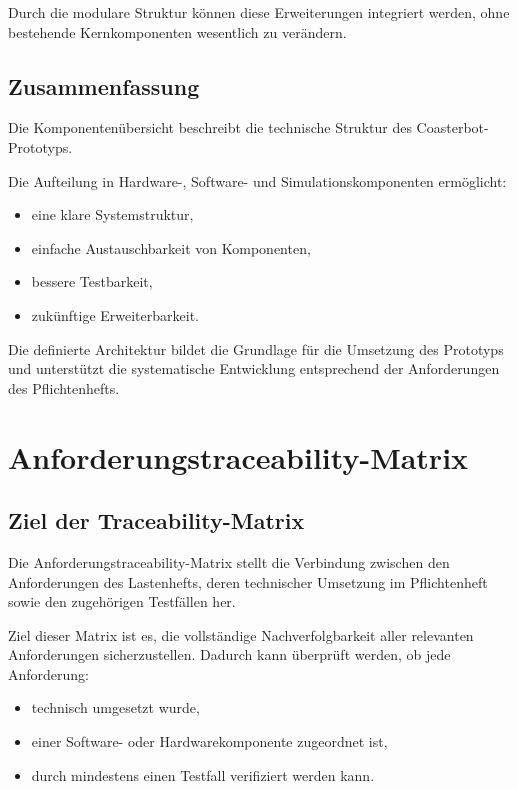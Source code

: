 \documentclass[
  a4paper,
  12pt,
  DIV=12,        %
  parskip=half,  %
  headings=small %
]{scrartcl}
\theoremstyle{definition}
\providecommand{\tightlist}{%
  \setlength{\itemsep}{0pt}\setlength{\parskip}{0pt}}
\theoremstyle{definition}
\begin{document}
Durch die modulare Struktur können diese Erweiterungen integriert
werden, ohne bestehende Kernkomponenten wesentlich zu verändern.

\subsection{Zusammenfassung}\label{zusammenfassung-6}

Die Komponentenübersicht beschreibt die technische Struktur des
Coasterbot-Prototyps.

Die Aufteilung in Hardware-, Software- und Simulationskomponenten
ermöglicht:

\begin{itemize}
\tightlist
\item
  eine klare Systemstruktur,
\item
  einfache Austauschbarkeit von Komponenten,
\item
  bessere Testbarkeit,
\item
  zukünftige Erweiterbarkeit.
\end{itemize}

Die definierte Architektur bildet die Grundlage für die Umsetzung des
Prototyps und unterstützt die systematische Entwicklung entsprechend der
Anforderungen des Pflichtenhefts.

\section{Anforderungstraceability-Matrix}\label{anforderungstraceability-matrix}

\subsection{Ziel der
Traceability-Matrix}\label{ziel-der-traceability-matrix}

Die Anforderungstraceability-Matrix stellt die Verbindung zwischen den
Anforderungen des Lastenhefts, deren technischer Umsetzung im
Pflichtenheft sowie den zugehörigen Testfällen her.

Ziel dieser Matrix ist es, die vollständige Nachverfolgbarkeit aller
relevanten Anforderungen sicherzustellen. Dadurch kann überprüft werden,
ob jede Anforderung:

\begin{itemize}
\tightlist
\item
  technisch umgesetzt wurde,
\item
  einer Software- oder Hardwarekomponente zugeordnet ist,
\item
  durch mindestens einen Testfall verifiziert werden kann.
\end{itemize}
\end{document}

